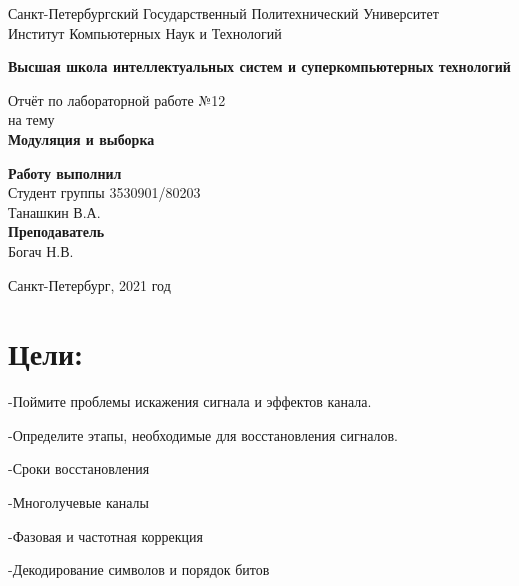 \documentclass[10pt,a4paper,oneside]{article}
\begin{document}
\begin{titlepage}
\newpage
	\begin{center}
		\Large Санкт-Петербургский Государственный Политехнический Университет\\
		Институт Компьютерных Наук и Технологий\\
	\end{center}
	\begin{center}
		\large\textbf {Высшая школа интеллектуальных систем и суперкомпьютерных технологий}
	\end{center}
	
	\vspace{5em}
	\begin{center}
		\large{Отчёт по лабораторной работе №12 \\ на тему \\
		\textbf{Модуляция и выборка} }
	\end{center}
	
	\vspace{25em}
	\begin{flushright}
		\textbf{Работу выполнил\\}Студент группы 3530901/80203 \\ Танашкин В.А.\\
		\textbf{Преподаватель\\}Богач Н.В. 
	\end{flushright}
	
	\vspace{\fill}%
	\begin{center}
	Санкт-Петербург, 2021 год	
	\end{center}
\end{titlepage} %

\section{Цели:}
    -Поймите проблемы искажения сигнала и эффектов канала.

-Определите этапы, необходимые для восстановления сигналов.

    -Сроки восстановления
    
    -Многолучевые каналы
    
    -Фазовая и частотная коррекция
    
    -Декодирование символов и порядок битов
    
\end{document}
